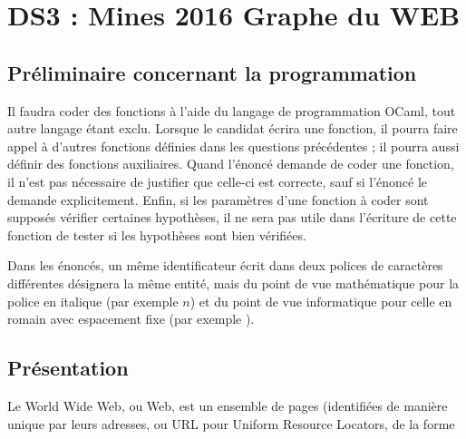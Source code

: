 \chapter{DS3 : Mines 2016
Graphe du WEB}
\section*{Préliminaire concernant la programmation}
Il faudra coder des fonctions à l'aide du langage de programmation OCaml, tout autre langage étant exclu. Lorsque le candidat écrira une fonction, il 
pourra faire appel à d'autres fonctions définies dans les questions précédentes ; il pourra aussi définir des fonctions auxiliaires. Quand l'énoncé 
demande de coder une fonction, il n'est pas nécessaire de justifier que celle-ci est correcte, sauf si l'énoncé le demande explicitement. Enfin, si les 
paramètres d'une fonction à coder sont supposés vérifier certaines hypothèses, il ne sera pas utile dans l'écriture de cette fonction de tester si les 
hypothèses sont bien vérifiées.

\medskip

Dans les énoncés, un même identificateur écrit dans deux polices de caractères différentes désignera la même entité, mais du point de vue mathématique pour la police en italique (par exemple $n$) et du point de vue informatique pour celle en romain avec espacement fixe (par exemple ).

\section{Présentation}
Le {\sf World Wide Web}, ou Web, est un ensemble de pages (identifiées de manière unique par leurs adresses, ou {\sf URL} pour {\sc Uniform Resource Locators}, de la forme

